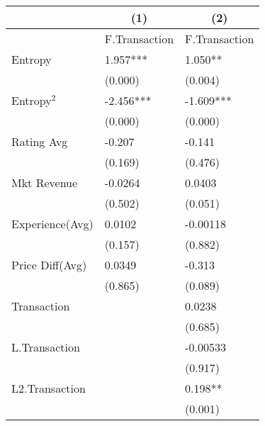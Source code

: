 \begin{table}[]
\centering
\begin{tabular}{@{}lll@{}}
\toprule
                           & \multicolumn{1}{c}{(1)} & \multicolumn{1}{c}{(2)} \\ \midrule
                           & F.Transaction           & F.Transaction           \\
Entropy                    & 1.957***                & 1.050**                 \\
                           & (0.000)                 & (0.004)                 \\
Entropy$^{2}$ & -2.456***               & -1.609***               \\
                           & (0.000)                 & (0.000)                 \\
Rating Avg                 & -0.207                  & -0.141                  \\
                           & (0.169)                 & (0.476)                 \\
Mkt Revenue                & -0.0264                 & 0.0403                  \\
                           & (0.502)                 & (0.051)                 \\
Experience(Avg)            & 0.0102                  & -0.00118                \\
                           & (0.157)                 & (0.882)                 \\
Price Diff(Avg)            & 0.0349                  & -0.313                  \\
                           & (0.865)                 & (0.089)                 \\
Transaction                &                         & 0.0238                  \\
                           &                         & (0.685)                 \\
L.Transaction              &                         & -0.00533                \\
                           &                         & (0.917)                 \\
L2.Transaction             &                         & 0.198**                 \\
                           &                         & (0.001)                 \\

\end{tabular}
\end{table}
